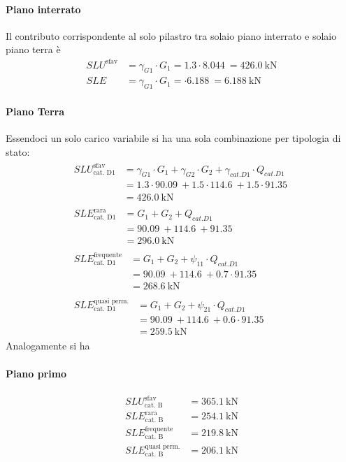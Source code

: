 \paragraph*{Piano interrato} Il contributo corrispondente al solo pilastro tra solaio piano interrato e solaio piano terra è
\begin{align*}
SLU^{\text{sfav}}&= \gamma_{G1}\cdot G_1 = 1.3\cdot\SI{8.044}{} =\SI{426.0}{\kilo\newton}\\
SLE &= \gamma_{G1}\cdot G_1 = \cdot\SI{6.188}{} =\SI{6.188}{\kilo\newton}
\end{align*}
\paragraph*{Piano Terra} Essendoci un solo carico variabile si ha una sola combinazione per tipologia di stato:
\begin{align} 
	\begin{split}
	SLU^{\text{sfav}}_{\text{cat. D1}} &= \gamma_{G1}\cdot G_1 + \gamma_{G2} \cdot G_2 + \gamma_{cat. D1} \cdot Q_{cat. D1}\\
	&= 1.3\cdot\SI{90.09}{} + 1.5\cdot\SI{114.6}{} + 1.5\cdot\SI{91.35}{} \\
	&= \SI{426.0}{\kilo\newton}
	\end{split} \\  
	\begin{split}
	SLE^{\text{rara}}_{\text{cat. D1}} &= G_1 + G_2 + Q_{cat. D1}\\
	&= \SI{90.09}{} + \SI{114.6}{} + \SI{91.35}{}\\
	&= \SI{296.0}{\kilo\newton}
	\end{split} \\ 
	\begin{split}
	SLE^{\text{frequente}}_{\text{cat. D1}} &= G_1 + G_2 + \psi_{11}\cdot Q_{cat. D1}\\
	&= \SI{90.09}{} + \SI{114.6}{} + 0.7\cdot\SI{91.35}{}\\
	&= \SI{268.6}{\kilo\newton}
	\end{split} \\ 
	\begin{split}
	SLE^{\text{quasi perm.}}_{\text{cat. D1}} &= G_1 + G_2 + \psi_{21}\cdot Q_{cat. D1}\\
	&= \SI{90.09}{} + \SI{114.6}{} + 0.6\cdot\SI{91.35}{}\\
	&= \SI{259.5}{\kilo\newton}
	\end{split} 
\end{align}
Analogamente si ha
\paragraph*{Piano primo}
\begin{align*} 
	SLU^{\text{sfav}}_{\text{cat. B}}		&= \SI{365.1}{\kilo\newton} \\	
	SLE^{\text{rara}}_{\text{cat. B}} 		&= \SI{254.1}{\kilo\newton} \\
	SLE^{\text{frequente}}_{\text{cat. B}} 	&= \SI{219.8}{\kilo\newton} \\
	SLE^{\text{quasi perm.}}_{\text{cat. B}}&= \SI{206.1}{\kilo\newton}
\end{align*}
